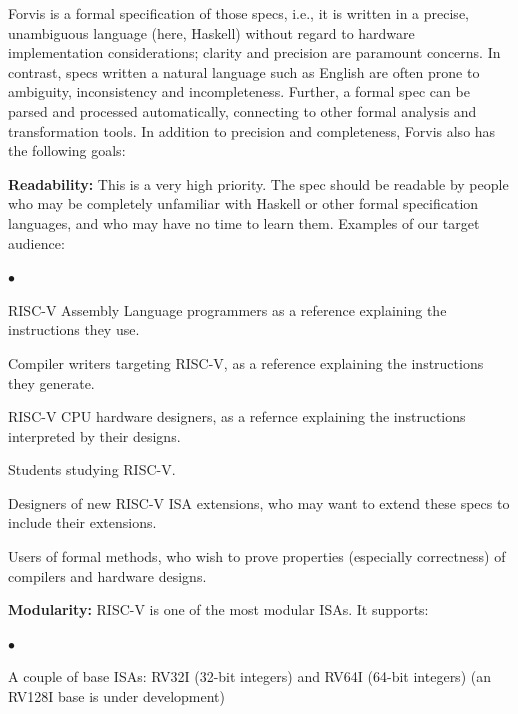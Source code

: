 \documentclass[11pt]{article}
\newenvironment{tightlist}%
{\begin{list}{$\bullet$}{%
    \setlength{\topsep}{0in}
    \setlength{\partopsep}{0in}
    \setlength{\itemsep}{0in}
    \setlength{\parsep}{0in}
    \setlength{\leftmargin}{1.5em}
    \setlength{\rightmargin}{0in}
    \setlength{\itemindent}{0in}
}
}%
{\end{list}
}
\begin{document}
Forvis is a formal specification of those specs, i.e., it is written
in a precise, unambiguous language (here, Haskell) without regard to
hardware implementation considerations; clarity and precision are
paramount concerns.  In contrast, specs written a natural language
such as English are often prone to ambiguity, inconsistency and
incompleteness.  Further, a formal spec can be parsed and processed
automatically, connecting to other formal analysis and transformation
tools.  In addition to precision and completeness, Forvis also has
the following goals:

\begin{itemize}

\item {\bf Readability:} This is a very high priority.  The spec
should be readable by people who may be completely unfamiliar with
Haskell or other formal specification languages, and who may have no
time to learn them.  Examples of our target audience:

  \begin{tightlist}
   \item RISC-V Assembly Language programmers as a reference explaining the instructions they use.

   \item Compiler writers targeting RISC-V, as a reference explaining the instructions they generate.

   \item RISC-V CPU hardware designers, as a refernce explaining the instructions interpreted by their designs.

   \item Students studying RISC-V.

   \item Designers of new RISC-V ISA extensions, who may want to
   extend these specs to include their extensions.

   \item Users of formal methods, who wish to prove properties
   (especially correctness) of compilers and hardware designs.

  \end{tightlist}

\item {\bf Modularity:} RISC-V is one of the most modular ISAs.  It
supports:

  \begin{tightlist}

   \item A couple of base ISAs: RV32I (32-bit integers) and RV64I
     (64-bit integers) (an RV128I base is under development)


\end{tightlist}
\end{itemize}
\end{document}
